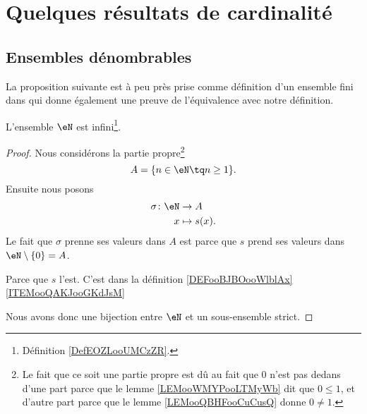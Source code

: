 
\section{Quelques résultats de cardinalité}
\label{SECooResultatsCardinalite}

\subsection{Ensembles dénombrables}
\label{SUBooEnsemblesDenombrables}

\begin{normaltext}	\label{NORMooEnsembleFiniEquivalenceDef}
	La proposition suivante est à peu près prise comme définition d'un ensemble fini dans \cite{ooVAYLooJxVYex} qui donne également une preuve de l'équivalence avec notre définition.
\end{normaltext}

\begin{proposition}     \label{PROPooBYKCooGDkfWy}
	L'ensemble \( \eN\) est infini\footnote{Définition \ref{DefEOZLooUMCzZR}.}.
\end{proposition}

\begin{proof}
	Nous considérons la partie propre\footnote{Le fait que ce soit une partie propre est dû au fait que \( 0\) n'est pas dedans d'une part parce que le lemme \ref{LEMooWMYPooLTMyWb} dit que \( 0\leq 1\), et d'autre part parce que le lemme \ref{LEMooQBHFooCuCusQ} donne \( 0\neq 1\).}
	\begin{equation}
		A=\{ n\in \eN\tq n\geq 1 \}.
	\end{equation}
	Ensuite nous posons
	\begin{equation}
		\begin{aligned}
			\sigma\colon \eN & \to A         \\
			x                & \mapsto s(x).
		\end{aligned}
	\end{equation}
	Le fait que \( \sigma\) prenne ses valeurs dans \( A\) est parce que \( s\) prend ses valeurs dans \( \eN\setminus\{ 0 \}=A\).
	\begin{subproof}
		Parce que \( s\) l'est.
		C'est dans la définition \ref{DEFooBJBOooWlblAx}\ref{ITEMooQAKJooGKdJsM}
	\end{subproof}
	Nous avons donc une bijection entre \( \eN\) et un sous-ensemble strict.
\end{proof}


